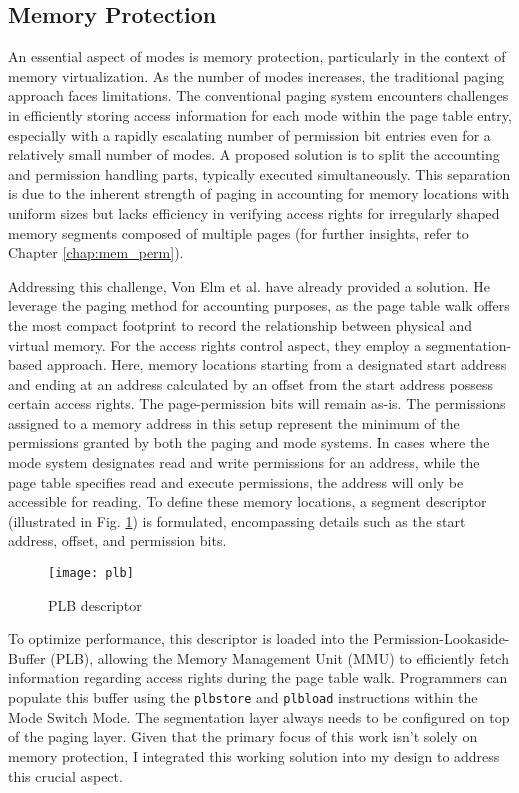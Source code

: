 \subsection{Memory Protection}
An essential aspect of modes is memory protection, particularly in the context
of memory virtualization. As the number of modes increases, the traditional
paging approach faces limitations. The conventional paging system encounters
challenges in efficiently storing access information for each mode within the
page table entry, especially with a rapidly escalating number of permission bit entries even
for a relatively small number of modes. A proposed solution is to split the
accounting and permission handling parts, typically executed simultaneously.
This separation is due to the inherent strength of paging in accounting for
memory locations with uniform sizes but lacks efficiency in verifying access
rights for irregularly shaped memory segments composed of multiple pages (for
further insights, refer to Chapter \ref{chap:mem_perm}).\par
Addressing this challenge, Von Elm et al.\cite{Cve} have already provided a solution. He
leverage the paging method for accounting purposes, as the page table walk
offers the most compact footprint to record the relationship between physical
and virtual memory. For the access rights control aspect, they employ a
segmentation-based approach. Here, memory locations starting from a designated
start address and ending at an address calculated by an offset from the start
address possess certain access rights. The page-permission bits will remain
as-is. The permissions assigned to a memory address in this setup represent the
minimum of the permissions granted by both the paging and mode systems. In cases
where the mode system designates read and write permissions for an address,
while the page table specifies read and execute permissions, the address will
only be accessible for reading. To define these memory locations, a segment
descriptor (illustrated in Fig. \ref{fig:plb_descriptor}) is formulated,
encompassing details such as the start address, offset, and permission bits.\par

\begin{figure}[h]
    \centering
    \texttt{[image: plb]}
    \caption{PLB descriptor}
    \label{fig:plb_descriptor}
\end{figure}

To optimize performance, this descriptor is loaded into the
Permission-Lookaside-Buffer (PLB), allowing the Memory Management Unit (MMU) to
efficiently fetch information regarding access rights during the page table
walk. Programmers can populate this buffer using the \texttt{plbstore} and \texttt{plbload}
instructions within the Mode Switch Mode. The segmentation layer always needs to be
configured on top of the paging layer. Given that the primary focus of this
work isn't solely on memory protection, I integrated this working
solution into my design to address this crucial aspect.

